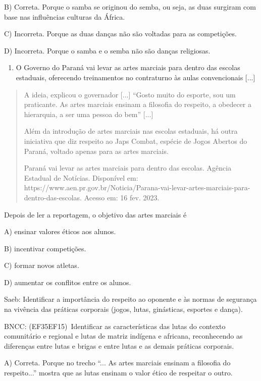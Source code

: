 B) Correta. Porque o samba se originou do semba, ou seja, as duas
surgiram com base nas influências culturas da África.

C) Incorreta. Porque as duas danças não são voltadas para as
competições.

D) Incorreta. Porque o samba e o semba não são danças religiosas.

\begin{enumerate}
\def\labelenumi{\arabic{enumi}.}
\item
  O Governo do Paraná vai levar as artes marciais para dentro das
  escolas estaduais, oferecendo treinamentos no contraturno às aulas
  convencionais {[}...{]}
\end{enumerate}

\begin{quote}
A ideia, explicou o governador {[}...{]} ``Gosto muito do esporte, sou
um praticante. As artes marciais ensinam a filosofia do respeito, a
obedecer a hierarquia, a ser uma pessoa do bem'' {[}...{]}

Além da introdução de artes marciais nas escolas estaduais, há outra
iniciativa que diz respeito ao Japs Combat, espécie de Jogos Abertos do
Paraná, voltado apenas para as artes marciais.

Paraná vai levar as artes marciais para dentro das escolas. Agência
Estadual de Notícias. Disponível em:
https://www.aen.pr.gov.br/Noticia/Parana-vai-levar-artes-marciais-para-dentro-das-escolas.
Acesso em: 16 fev. 2023.
\end{quote}

Depois de ler a reportagem, o objetivo das artes marciais é

A) ensinar valores éticos aos alunos.

B) incentivar competições.

C) formar novos atletas.

D) aumentar os conflitos entre os alunos.

Saeb: \protect\hypertarget{_Hlk127430492}{}{}Identificar a importância
do respeito ao oponente e às normas de segurança na vivência das
práticas corporais (jogos, lutas, ginásticas, esportes e dança).

BNCC: (EF35EF15)~Identificar as características das lutas do contexto
comunitário e regional e lutas de matriz indígena e africana,
reconhecendo as diferenças entre lutas e brigas e entre lutas e as
demais práticas corporais.

A) Correta. Porque no trecho ``... As artes marciais ensinam a filosofia
do respeito...'' mostra que as lutas ensinam o valor ético de respeitar
o outro.

